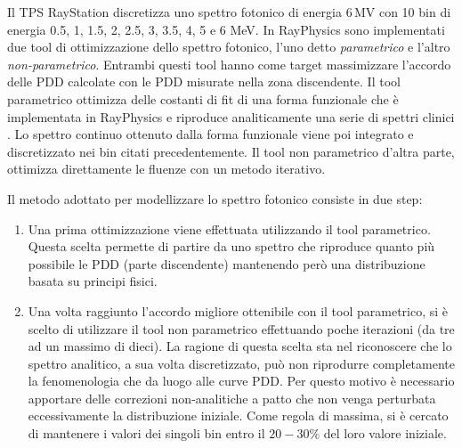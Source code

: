 Il TPS RayStation discretizza uno spettro fotonico di energia $6\,$MV con 10 bin di energia 0.5, 1, 1.5, 2, 2.5, 3, 3.5, 4, 5 e 6 MeV. In RayPhysics sono implementati due tool di ottimizzazione dello spettro fotonico, l'uno detto \textit{parametrico} e l'altro \textit{non-parametrico}. Entrambi questi tool hanno come target massimizzare l'accordo delle PDD calcolate con le PDD misurate nella zona discendente. Il tool parametrico ottimizza delle costanti di fit di una forma funzionale che è implementata in RayPhysics e riproduce analiticamente una serie di spettri clinici \cite{RaySearchLaboratories2014}. Lo spettro continuo ottenuto dalla forma funzionale viene poi integrato e discretizzato nei bin citati precedentemente. Il tool non parametrico d'altra parte, ottimizza direttamente le fluenze con un metodo iterativo.

Il metodo adottato per modellizzare lo spettro fotonico consiste in due step:
\begin{enumerate}
\item Una prima ottimizzazione viene effettuata utilizzando il tool parametrico. Questa scelta permette di partire da uno spettro che riproduce quanto più possibile le PDD (parte discendente) mantenendo però una distribuzione basata su principi fisici.
\item Una volta raggiunto l'accordo migliore ottenibile con il tool parametrico, si è scelto di utilizzare il tool non parametrico effettuando poche iterazioni (da tre ad un massimo di dieci). La ragione di questa scelta sta nel riconoscere che lo spettro analitico, a sua volta discretizzato, può non riprodurre completamente la fenomenologia che da luogo alle curve PDD. Per questo motivo è necessario apportare delle correzioni non-analitiche a patto che non venga perturbata eccessivamente la distribuzione iniziale. Come regola di massima, si è cercato di mantenere i valori dei singoli bin entro il $20-30\%$ del loro valore iniziale.
\end{enumerate}

